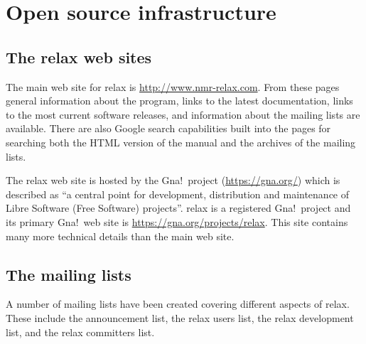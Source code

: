 
\chapter{Open source infrastructure} \label{ch: open source}




\section{The relax web sites}

The main web site for relax is \href{http://www.nmr-relax.com}{http://www.nmr-relax.com}.  From these pages general information about the program, links to the latest documentation, links to the most current software releases, and information about the mailing lists are available.  There are also Google search capabilities built into the pages for searching both the HTML version of the manual and the archives of the mailing lists.

The relax web site is hosted by the Gna!\ project (\href{https://gna.org/}{https://gna.org/}) which is described as ``a central point for development, distribution and maintenance of Libre Software (Free Software) projects''.  relax is a registered Gna!\ project and its primary Gna!\ web site is \href{https://gna.org/projects/relax}{https://gna.org/projects/relax}.  This site contains many more technical details than the main web site.




\section{The mailing lists}

A number of mailing lists have been created covering different aspects of relax.  These include the announcement list, the relax users list, the relax development list, and the relax committers list.


